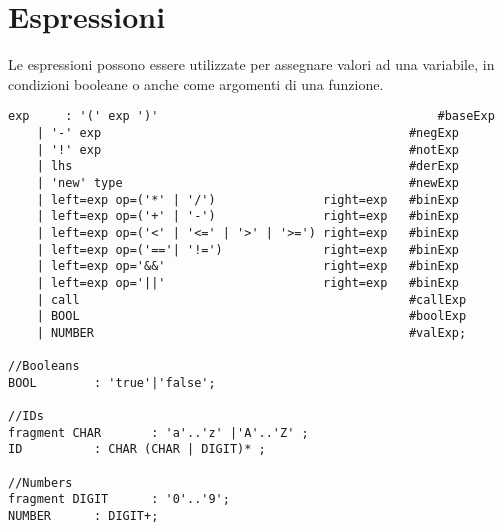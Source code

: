 \documentclass[../../main]{subfiles}
\begin{document}
\section{Espressioni}\label{s:espressioni}
Le espressioni possono essere utilizzate per assegnare valori ad una variabile, in condizioni booleane o anche come argomenti di una funzione.
\begin{lstlisting}[style=antlr]
exp	    : '(' exp ')'				                        #baseExp
    | '-' exp					                        #negExp
    | '!' exp                                           #notExp
    | lhs						                        #derExp
    | 'new' type					                    #newExp
    | left=exp op=('*' | '/')               right=exp   #binExp
    | left=exp op=('+' | '-')               right=exp   #binExp
    | left=exp op=('<' | '<=' | '>' | '>=') right=exp   #binExp
    | left=exp op=('=='| '!=')              right=exp   #binExp
    | left=exp op='&&'                      right=exp   #binExp
    | left=exp op='||'                      right=exp   #binExp
    | call                                              #callExp
    | BOOL                                              #boolExp
    | NUMBER					                        #valExp;

//Booleans
BOOL        : 'true'|'false';

//IDs
fragment CHAR 	    : 'a'..'z' |'A'..'Z' ;
ID          : CHAR (CHAR | DIGIT)* ;

//Numbers
fragment DIGIT	    : '0'..'9';
NUMBER      : DIGIT+;
\end{lstlisting}
\end{document}
